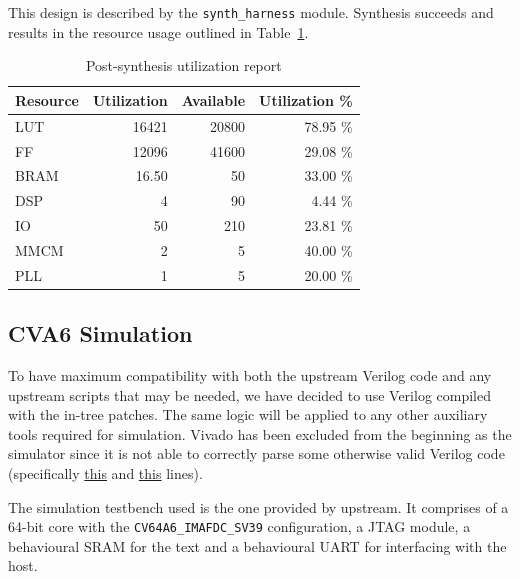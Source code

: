 \documentclass[a4paper,11pt]{article}
\begin{document}
This design is described by the \texttt{synth\_harness} module. Synthesis
succeeds and results in the resource usage outlined in Table~\ref{synth-util}.

\begin{table}[H]
  \centering
  \begin{tabular}{lrrr}
    \toprule
    Resource & Utilization & Available & Utilization \% \\\midrule
    LUT      & 16421       & 20800     & 78.95 \% \\
    FF       & 12096       & 41600     & 29.08 \% \\
    BRAM     & 16.50       & 50        & 33.00 \% \\
    DSP      & 4           & 90        &  4.44 \% \\
    IO       & 50          & 210       & 23.81 \% \\
    MMCM     & 2           & 5         & 40.00 \% \\
    PLL      & 1           & 5         & 20.00 \% \\
    \bottomrule
  \end{tabular}
  \caption{Post-synthesis utilization report}%
  \label{synth-util}
\end{table}

\subsection{CVA6 Simulation}

To have maximum compatibility with both the upstream Verilog code and any
upstream scripts that may be needed, we have decided to use Verilog compiled
with the in-tree patches. The same logic will be applied to any other auxiliary
tools required for simulation. Vivado has been excluded from the beginning as
the simulator since it is not able to correctly parse some otherwise valid
Verilog code (specifically
\href{https://github.com/openhwgroup/cva6/blob/db088159ebca1480b3c5f083f5ac4268ea6749b6/vendor/pulp-platform/common_cells/include/common_cells/registers.svh#L47}{this}
and
\href{https://github.com/openhwgroup/cva6/blob/db088159ebca1480b3c5f083f5ac4268ea6749b6/vendor/pulp-platform/common_cells/include/common_cells/registers.svh#L125}{this}
lines).

The simulation testbench used is the one provided by upstream. It comprises of a
64-bit core with the \texttt{CV64A6\_IMAFDC\_SV39} configuration, a JTAG module,
a behavioural SRAM for the text and a behavioural UART for interfacing with the
host.
\end{document}
